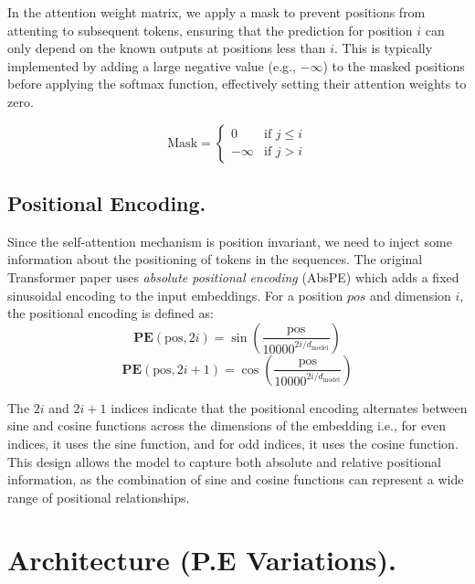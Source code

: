 \documentclass[10pt]{article}
\theoremstyle{plain}
\begin{document}
\begin{remark}[Masking.]
    In the attention weight matrix, we apply a mask to prevent positions from attenting to subsequent tokens, ensuring that the prediction for position \(i\) can only depend on the known outputs at positions less than \(i\). This is typically implemented by adding a large negative value (e.g., \(-\infty\)) to the masked positions before applying the softmax function, effectively setting their attention weights to zero.

\[
    \text{Mask} = \begin{cases}
        0 & \text{if } j \leq i \\
        -\infty & \text{if } j > i
    \end{cases}
\]

\end{remark}

\subsection{Positional Encoding.}

Since the self-attention mechanism is position invariant, we need to inject some information about the positioning of tokens in the sequences. The original Transformer paper uses \emph{absolute positional encoding} (AbsPE) which adds a fixed sinusoidal encoding to the input embeddings. For a position \(pos\) and dimension \(i\), the positional encoding is defined as:
\[
    \mathbf{PE} (\text{pos}, 2i) = \sin\left(\frac{\text{pos}}{10000^{2i/d_{\text{model}}}}\right)
\]
\[
    \mathbf{PE} (\text{pos}, 2i+1) = \cos\left(\frac{\text{pos}}{10000^{2i/d_{\text{model}}}}\right)
\]

\begin{important}
    The \(2i\) and \(2i+1\) indices indicate that the positional encoding alternates between sine and cosine functions across the dimensions of the embedding i.e., for even indices, it uses the sine function, and for odd indices, it uses the cosine function. This design allows the model to capture both absolute and relative positional information, as the combination of sine and cosine functions can represent a wide range of positional relationships. 
\end{important}

\vspace{0.1in}

\section{Architecture (P.E Variations).}
\end{document}
